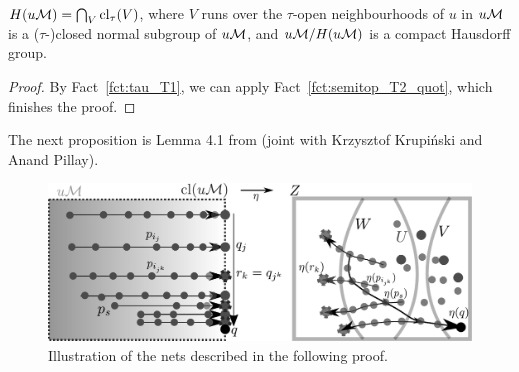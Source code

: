 	\begin{fct}
		\label{fct:H(uM)}
		$H(u{\mathcal M})=\bigcap_V \operatorname{{cl}}_\tau(V)$, where $V$ runs over the $\tau$-open neighbourhoods of $u$ in $u{\mathcal M}$ is a ($\tau$-)closed normal subgroup of $u{\mathcal M}$, and $u{\mathcal M}/H(u{\mathcal M})$ is a compact Hausdorff group.
	\end{fct}
	\begin{proof}
		By Fact~\ref{fct:tau_T1}, we can apply Fact~\ref{fct:semitop_T2_quot}, which finishes the proof.
	\end{proof}
	
	The next proposition is Lemma 4.1 from \cite{KPR15} (joint with Krzysztof Krupiński and Anand Pillay).
	
	\begin{figure}[H]
		\centering
		\includegraphics[width={\textwidth}]{drawingbw.pdf}
		{Illustration of the nets described in the following proof.}
	\end{figure}
	
